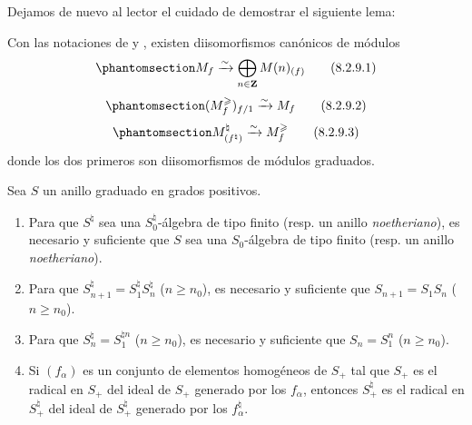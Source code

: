 \documentclass[oneside,10pt]{amsart}
\renewcommand{\geq}{\geqslant}
\let\EGAOriginalLabel\label
\renewcommand{\label}[1]{\phantomsection\EGAOriginalLabel{#1}}
\begin{document}
Dejamos de nuevo al lector el cuidado de demostrar el siguiente lema:
\begin{lemma}[8.2.9]
\label{II.8.2.9-fr}
Con las notaciones de  y , existen diisomorfismos canónicos de módulos
\begin{equation}
\label{II.8.2.9.1-fr}
  M_f\xrightarrow{\sim}\bigoplus_{n\in\mathbf{Z}}M(n)_{(f)}
\tag{8.2.9.1}
\end{equation}
\begin{equation}
\label{II.8.2.9.2-fr}
  (M_f^{\geq})_{f/1}\xrightarrow{\sim}M_f
\tag{8.2.9.2}
\end{equation}
\begin{equation}
\label{II.8.2.9.3-fr}
  M^\natural_{(f^\natural)}\xrightarrow{\sim}M_f^{\geq}
\tag{8.2.9.3}
\end{equation}
donde los dos primeros son diisomorfismos de módulos graduados.
\end{lemma}

\begin{lemma}[8.2.10]
\label{II.8.2.10-fr}
Sea $S$ un anillo graduado en grados positivos.
\begin{enumerate}
  \item[\rm{(i)}] Para que $S^\natural$ sea una $S_0^\natural$-álgebra de tipo finito \textup{(resp. un anillo \emph{noetheriano})}, es necesario y suficiente que $S$ sea una $S_0$-álgebra de tipo finito \textup{(resp. un anillo \emph{noetheriano})}.
  \item[\rm{(ii)}] Para que $S_{n+1}^\natural=S_1^\natural S_n^\natural$ ($n\geq n_0$), es necesario y suficiente que $S_{n+1}=S_1S_n$ ($n\geq n_0$).
  \item[\rm{(iii)}] Para que $S_n^\natural=S_1^{\natural n}$ ($n\geq n_0$), es necesario y suficiente que $S_n=S_1^n$ ($n\geq n_0$).
  \item[\rm{(iv)}] Si $(f_\alpha)$ es un conjunto de elementos homogéneos de $S_+$ tal que $S_+$ es el radical en $S_+$ del ideal de $S_+$ generado por los $f_\alpha$, entonces $S_+^\natural$ es el radical en $S_+^\natural$ del ideal de $S_+^\natural$ generado por los $f_\alpha^\natural$.
\end{enumerate}
\end{lemma}
\end{document}
